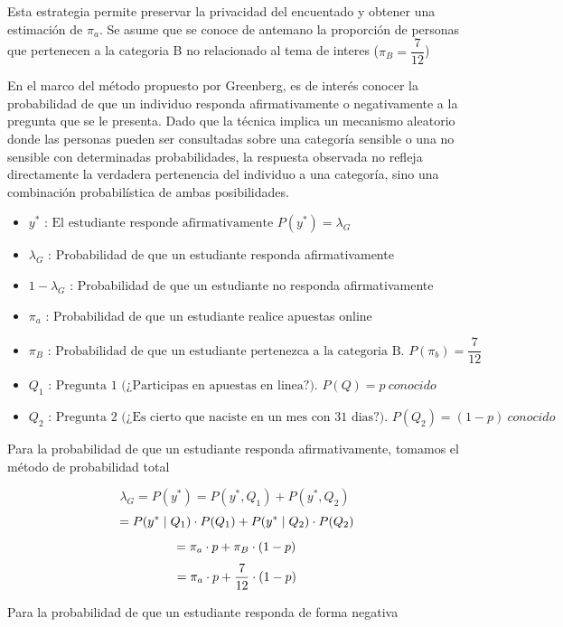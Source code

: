 \documentclass[
]{article}
\begin{document}
Esta estrategia permite preservar la privacidad del encuentado y obtener
una estimación de \(\pi_a\). Se asume que se conoce de antemano la
proporción de personas que pertenecen a la categoria B no relacionado al tema de interes
(\(\pi_B = \dfrac{7}{12}\))

En el marco del método propuesto por Greenberg, es de interés conocer la
probabilidad de que un individuo responda afirmativamente o
negativamente a la pregunta que se le presenta. Dado que la técnica
implica un mecanismo aleatorio donde las personas pueden ser consultadas
sobre una categoría sensible o una no sensible con determinadas
probabilidades, la respuesta observada no refleja directamente la
verdadera pertenencia del individuo a una categoría, sino una
combinación probabilística de ambas posibilidades.

\begin{itemize}
\item
  \(y^* \text{ : } \text{El estudiante responde afirmativamente } P(y^*) = \lambda_G\)
\item
  \(\lambda_G\) : Probabilidad de que un estudiante responda
  afirmativamente
\item
  \(1 - \lambda_G\) : Probabilidad de que un estudiante no responda
  afirmativamente
\item
  \(\pi_a\) : Probabilidad de que un estudiante realice apuestas online
\item
  \(\pi_B \text{ : } \text{Probabilidad de que un estudiante pertenezca a la categoria B. } P(\pi_b) = \dfrac{7}{12}\)
\item
  \(Q_1 \text{ : } \text{Pregunta 1 (¿Participas en apuestas en linea?). } P(Q)=p \ conocido\)
\item
  \(Q_2 \text{ : } \text{Pregunta 2 (¿Es cierto que naciste en un mes con 31 dias?). } P(Q_2)=(1-p) \ conocido\)
\end{itemize}

Para la probabilidad de que un estudiante responda afirmativamente,
tomamos el método de probabilidad total

\[ \lambda_G = P(y^*) = P(y^*,Q_1) + P(y^*,Q_2)\]
\[\\ = P(y^* \mid Q_1) \cdot P(Q_1) + P(y^* \mid Q_2) \cdot P(Q_2) \]
\[\\= \pi_a \cdot p + \pi_B \cdot (1 - p)\]
\[\\= \pi_a \cdot p + \dfrac{7}{12} \cdot (1 - p)\]

Para la probabilidad de que un estudiante responda de forma negativa
\end{document}
